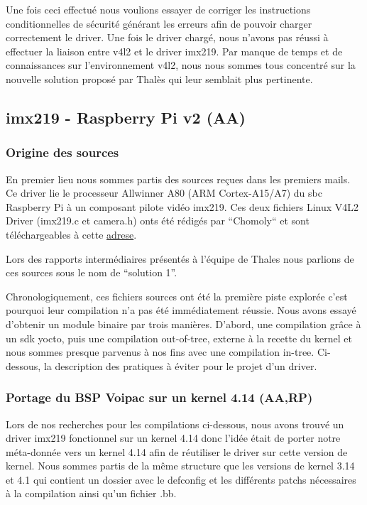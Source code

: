 {Une fois ceci effectué nous voulions essayer de corriger les instructions conditionnelles de
sécurité générant les erreurs afin de pouvoir charger correctement le driver. Une fois le
driver chargé, nous n’avons pas réussi à effectuer la liaison entre v4l2 et le driver imx219.
Par manque de temps et de connaissances sur l’environnement v4l2, nous nous sommes
tous concentré sur la nouvelle solution proposé par Thalès qui leur semblait plus
pertinente.

\subsection{imx219 - Raspberry Pi v2 (AA)}

\subsubsection{Origine des sources}
En premier lieu nous sommes partis des sources reçues dans les premiers
mails. Ce driver lie le processeur Allwinner A80 (ARM Cortex-A15/A7) du sbc Raspberry Pi à un
composant pilote vidéo imx219. Ces deux fichiers Linux V4L2 Driver (imx219.c et
camera.h) onts été rédigés par “Chomoly“ et sont téléchargeables à cette 
\href{https://www.raspberrypi.org/forums/viewtopic.php?f=43&t=162722}{adrese}. \medskip

Lors des rapports intermédiaires présentés à l’équipe de Thales nous parlions de ces
sources sous le nom de “solution 1”. \medskip

Chronologiquement, ces fichiers sources ont été la première piste explorée c’est pourquoi
leur compilation n’a pas été immédiatement réussie. Nous avons essayé d’obtenir un
module binaire par trois manières. D’abord, une compilation grâce à un sdk yocto, puis
une compilation out-of-tree, externe à la recette du kernel et nous sommes presque
parvenus à nos fins avec une compilation in-tree. Ci-dessous, la description des pratiques
à éviter pour le projet d’un driver.

\subsubsection{Portage du BSP Voipac sur un kernel 4.14 (AA,RP)}

Lors de nos recherches pour les compilations ci-dessous, nous avons trouvé un driver
imx219 fonctionnel sur un kernel 4.14 donc l’idée était de porter notre méta-donnée vers
un kernel 4.14 afin de réutiliser le driver sur cette version de kernel.
Nous sommes partis de la même structure que les versions de kernel 3.14 et 4.1 qui
contient un dossier avec le defconfig et les différents patchs nécessaires à la compilation
ainsi qu’un fichier .bb.

}
